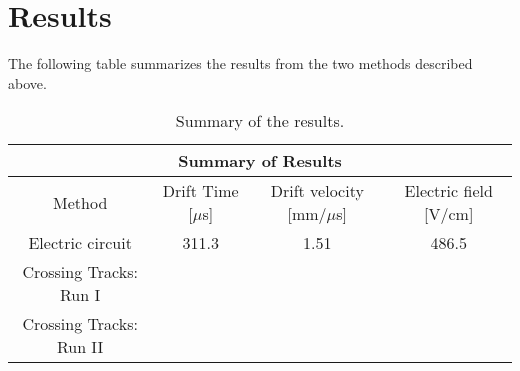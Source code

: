 \section{Results}\label{sec:Results}
The following table summarizes the results from the two methods described above.
\begin{center}
\begin{table}[htb]
  \begin{center}
    \begin{tabular}{c|c|c|c}
      \multicolumn{4}{c}{\textbf{Summary of Results}} \\
      \hline \hline
       Method & Drift Time [$\mu$s] & Drift velocity [mm/$\mu$s]  & Electric field [V/cm]\\
       \hline
       Electric circuit        & 311.3  & 1.51 & 486.5 \\
       \hline
       Crossing Tracks: Run I  &  & \\
       \hline
       Crossing Tracks: Run II &  & \\
       \hline
       \hline
       \end{tabular}%
    \caption{Summary of the results. }
    \label{tab:ResultsFinal}
    \end{center}
\end{table}
\end{center}
